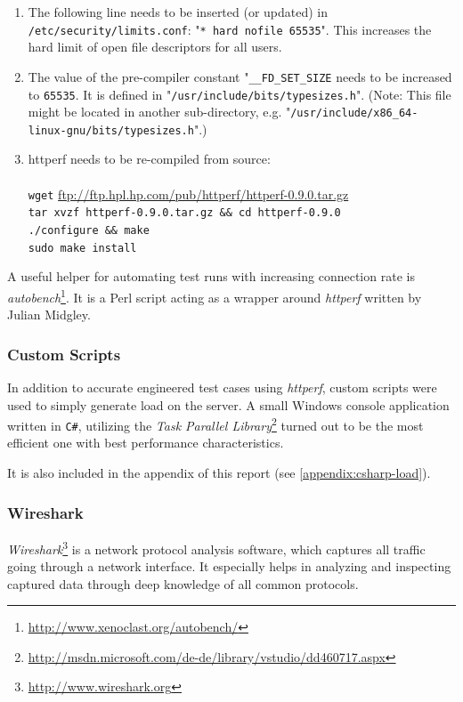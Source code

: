 \begin{enumerate}
\item The following line needs to be inserted (or updated) in \texttt{/etc/security/limits.conf}: "\texttt{* hard nofile 65535}". This increases the hard limit of open file descriptors for all users.

\item The value of the pre-compiler constant "\texttt{\_\_FD\_SET\_SIZE} needs to be increased to \texttt{65535}. It is defined in "\texttt{/usr/include/bits/typesizes.h}". (Note: This file might be located in another sub-directory, e.g. "\texttt{/usr/include/x86\_64-linux-gnu/bits/typesizes.h}".)

\item httperf needs to be re-compiled from source:\\
 \\
\texttt{wget} \url{ftp://ftp.hpl.hp.com/pub/httperf/httperf-0.9.0.tar.gz}\\
\texttt{tar xvzf httperf-0.9.0.tar.gz \&\& cd httperf-0.9.0\\
./configure \&\& make\\
sudo make install}
\end{enumerate}

A useful helper for automating test runs with increasing connection rate is \textit{autobench}\footnote{\url{http://www.xenoclast.org/autobench/}}. It is a Perl script acting as a wrapper around \textit{httperf} written by Julian Midgley.

\subsubsection{Custom Scripts}

In addition to accurate engineered test cases using \textit{httperf}, custom scripts were used to simply generate load on the server. A small Windows console application written in \texttt{C\#}, utilizing the \textit{Task Parallel Library}\footnote{\url{http://msdn.microsoft.com/de-de/library/vstudio/dd460717.aspx}} turned out to be the most efficient one with best performance characteristics.

It is also included in the appendix of this report (see \ref{appendix:csharp-load}).

\subsubsection{Wireshark}

\textit{Wireshark}\footnote{\url{http://www.wireshark.org}} is a network protocol analysis software, which captures all traffic going through a network interface. It especially helps in analyzing and inspecting captured data through deep knowledge of all common protocols.

